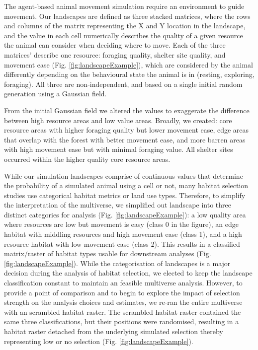 \documentclass[10pt,a4paper]{article}
\begin{document}
The agent-based animal movement simulation require an environment to guide movement.
Our landscapes are defined as three stacked matrices, where the rows and columns of the matrix representing the X and Y location in the landscape, and the value in each cell numerically describes the quality of a given resource the animal can consider when deciding where to move.
Each of the three matrices' describe one resource: foraging quality, shelter site quality, and movement ease (Fig. \ref{fig:landscapeExample}), which are considered by the animal differently depending on the behavioural state the animal is in (resting, exploring, foraging).
All three are non-independent, and based on a single initial random generation using a Gaussian field.

From the initial Gaussian field we altered the values to exaggerate the difference between high resource areas and low value areas.
Broadly, we created: core resource areas with higher foraging quality but lower movement ease, edge areas that overlap with the forest with better movement ease, and more barren areas with high movement ease but with minimal foraging value.
All shelter sites occurred within the higher quality core resource areas.

While our simulation landscapes comprise of continuous values that determine the probability of a simulated animal using a cell or not, many habitat selection studies use categorical habitat metrics or land use types.
Therefore, to simplify the interpretation of the multiverse, we simplified out landscape into three distinct categories for analysis (Fig. \ref{fig:landscapeExample}): a low quality area where resources are low but movement is easy (class 0 in the figure), an edge habitat with middling resources and high movement ease (class 1), and a high resource habitat with low movement ease (class 2).
This results in a classified matrix/raster of habitat types usable for downstream analyses (Fig. \ref{fig:landscapeExample}).
While the categorisation of landscapes is a major decision during the analysis of habitat selection, we elected to keep the landscape classification constant to maintain an feasible multiverse analysis.
However, to provide a point of comparison and to begin to explore the impact of selection strength on the analysis choices and estimates, we re-ran the entire multiverse with an scrambled habitat raster.
The scrambled habitat raster contained the same three classifications, but their positions were randomised, resulting in a habitat raster detached from the underlying simulated selection thereby representing low or no selection (Fig. \ref{fig:landscapeExample}).
\end{document}

